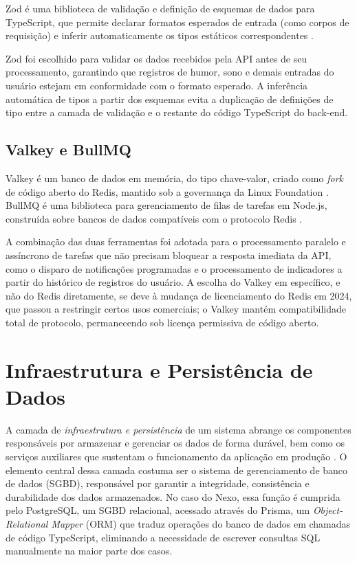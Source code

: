 Zod é uma biblioteca de validação e definição de esquemas de dados para
TypeScript, que permite declarar formatos esperados de entrada (como corpos
de requisição) e inferir automaticamente os tipos estáticos correspondentes
\citep{zod:2026}.

Zod foi escolhido para validar os dados recebidos pela API antes de seu
processamento, garantindo que registros de humor, sono e demais entradas do
usuário estejam em conformidade com o formato esperado. A inferência
automática de tipos a partir dos esquemas evita a duplicação de definições de
tipo entre a camada de validação e o restante do código TypeScript do
back-end.

\subsection{Valkey e BullMQ}

Valkey é um banco de dados em memória, do tipo chave-valor, criado como
\textit{fork} de código aberto do Redis, mantido sob a governança da Linux
Foundation \citep{valkey:2026}. BullMQ é uma biblioteca para gerenciamento de
filas de tarefas em Node.js, construída sobre bancos de dados compatíveis com
o protocolo Redis \citep{bullmq:2026}.

A combinação das duas ferramentas foi adotada para o processamento paralelo
e assíncrono de tarefas que não precisam bloquear a resposta imediata da API,
como o disparo de notificações programadas e o processamento de indicadores
a partir do histórico de registros do usuário. A escolha do Valkey em
específico, e não do Redis diretamente, se deve à mudança de licenciamento do
Redis em 2024, que passou a restringir certos usos comerciais; o Valkey
mantém compatibilidade total de protocolo, permanecendo sob licença
permissiva de código aberto.

\section{Infraestrutura e Persistência de Dados}

A camada de \textit{infraestrutura e persistência} de um sistema abrange os
componentes responsáveis por armazenar e gerenciar os dados de forma durável,
bem como os serviços auxiliares que sustentam o funcionamento da aplicação em
produção \cite{Fowler_2013}. O elemento central dessa camada costuma ser o
sistema de gerenciamento de banco de dados (SGBD), responsável por garantir a
integridade, consistência e durabilidade dos dados armazenados. No caso do
Nexo, essa função é cumprida pelo PostgreSQL, um SGBD relacional, acessado
através do Prisma, um \textit{Object-Relational Mapper} (ORM) que traduz
operações do banco de dados em chamadas de código TypeScript, eliminando a
necessidade de escrever consultas SQL manualmente na maior parte dos casos.

